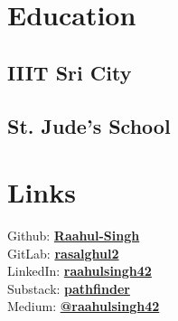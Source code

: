 \documentclass[]{deedy-resume-openfont}
\begin{document}
\begin{minipage}[t]{0.33\textwidth} 


\section{Education} 

\subsection{IIIT Sri City}
\sectionsep


\subsection{St. Jude's School}
\sectionsep


\section{Links} 
Github: \href{https://github.com/Raahul-Singh}{\bf Raahul-Singh} \\
GitLab:  \href{https://gitlab.com/rasalghul2}{\bf rasalghul2} \\
LinkedIn:  \href{https://linkedin.com/in/raahulsingh42}{\bf raahulsingh42} \\
Substack:  \href{https://raahulsingh.substack.com}{\bf pathfinder} \\
Medium:  \href{https://medium.com/@_hawks_}{\bf @raahulsingh42} \\





\end{minipage}
\end{document}
